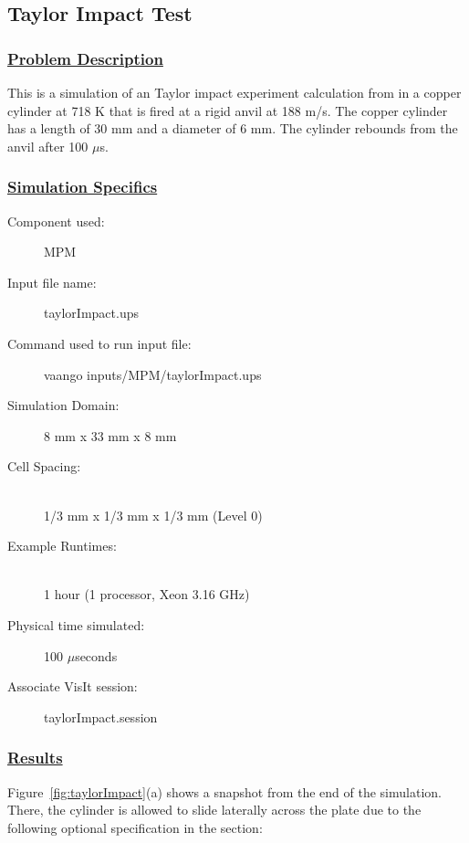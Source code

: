 \subsection*{\center Taylor Impact Test}
\subsubsection*{\underline{Problem Description}}
This is a simulation of an Taylor impact experiment calculation from 
\cite{Gust1982} in a copper cylinder at 718 K that is fired at a
rigid anvil at 188 m/s.  The copper cylinder has a length of 30 mm and
a diameter of 6 mm.  The cylinder rebounds from the anvil after 100 $\mu$s.
 
\subsubsection*{\underline{Simulation Specifics}}
\begin{description} 
\item [Component used:] \hfill MPM
\item [Input file name:] \hfill taylorImpact.ups
\item [Command used to run input file:]\hfill vaango inputs/MPM/taylorImpact.ups
\item [Simulation Domain:]\hfill 8 mm x 33 mm x 8 mm

\item [Cell Spacing:]\hfill \\ 
  1/3 mm x 1/3 mm x 1/3 mm (Level 0)

\item [Example Runtimes:] \hfill \\
  1 hour   (1 processor, Xeon 3.16 GHz)\\

\item [Physical time simulated:] \hfill 100 $\mu$seconds

\item [Associate VisIt session:] \hfill taylorImpact.session

\end{description}

\subsubsection*{\underline{Results}}
Figure~\ref{fig:taylorImpact}(a) shows a snapshot from the end of the simulation.
There, the cylinder is allowed to slide laterally across the plate due
to the following optional specification in the 
section:

